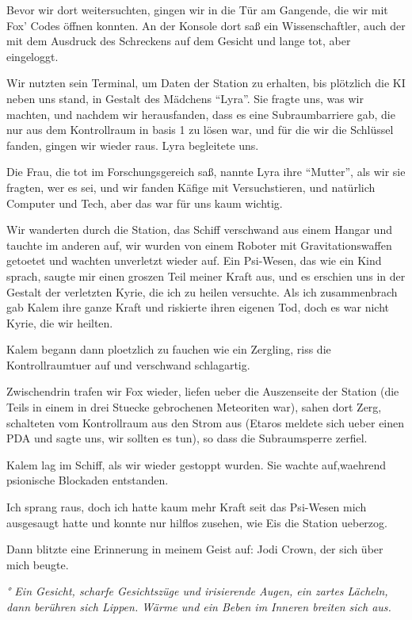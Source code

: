 \documentclass[11pt]{article}
\begin{document}
Bevor wir dort weitersuchten, gingen wir in die Tür am Gangende, die wir
mit Fox' Codes öffnen konnten. An der Konsole dort saß ein
Wissenschaftler, auch der mit dem Ausdruck des Schreckens auf dem
Gesicht und lange tot, aber eingeloggt.

Wir nutzten sein Terminal, um Daten der Station zu erhalten, bis
plötzlich die KI neben uns stand, in Gestalt des Mädchens ``Lyra''. Sie
fragte uns, was wir machten, und nachdem wir herausfanden, dass es eine
Subraumbarriere gab, die nur aus dem Kontrollraum in basis 1 zu lösen
war, und für die wir die Schlüssel fanden, gingen wir wieder raus. Lyra
begleitete uns.

Die Frau, die tot im Forschungsgereich saß, nannte Lyra ihre ``Mutter'',
als wir sie fragten, wer es sei, und wir fanden Käfige mit
Versuchstieren, und natürlich Computer und Tech, aber das war für uns
kaum wichtig.

Wir wanderten durch die Station, das Schiff verschwand aus einem Hangar
und tauchte im anderen auf, wir wurden von einem Roboter mit
Gravitationswaffen getoetet und wachten unverletzt wieder auf. Ein
Psi-Wesen, das wie ein Kind sprach, saugte mir einen groszen Teil meiner
Kraft aus, und es erschien uns in der Gestalt der verletzten Kyrie, die
ich zu heilen versuchte. Als ich zusammenbrach gab Kalem ihre ganze
Kraft und riskierte ihren eigenen Tod, doch es war nicht Kyrie, die wir
heilten.

Kalem begann dann ploetzlich zu fauchen wie ein Zergling, riss die
Kontrollraumtuer auf und verschwand schlagartig.

Zwischendrin trafen wir Fox wieder, liefen ueber die Auszenseite der
Station (die Teils in einem in drei Stuecke gebrochenen Meteoriten war),
sahen dort Zerg, schalteten vom Kontrollraum aus den Strom aus (Etaros
meldete sich ueber einen PDA und sagte uns, wir sollten es tun), so dass
die Subraumsperre zerfiel.

Kalem lag im Schiff, als wir wieder gestoppt wurden. Sie wachte
auf,waehrend psionische Blockaden entstanden.

Ich sprang raus, doch ich hatte kaum mehr Kraft seit das Psi-Wesen mich
ausgesaugt hatte und konnte nur hilflos zusehen, wie Eis die Station
ueberzog.

Dann blitzte eine Erinnerung in meinem Geist auf: Jodi Crown, der sich
über mich beugte.

\emph{° Ein Gesicht, scharfe Gesichtszüge und irisierende Augen, ein
zartes Lächeln, dann berühren sich Lippen. Wärme und ein Beben im
Inneren breiten sich aus.}
\end{document}
